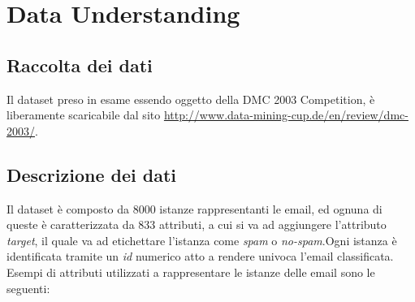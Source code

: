 \chapter{Data Understanding}
\section{Raccolta dei dati}
Il dataset preso in esame essendo oggetto della DMC 2003 Competition, è liberamente scaricabile dal sito \url{http://www.data-mining-cup.de/en/review/dmc-2003/}.


\section{Descrizione dei dati}
Il dataset è composto da 8000 istanze rappresentanti le email, ed ognuna di queste è caratterizzata da 833 attributi, a cui si va ad aggiungere l'attributo \textit{target}, il quale va ad etichettare l'istanza come \textit{spam} o \textit{no-spam}.Ogni istanza è identificata tramite un \textit{id} numerico atto a rendere univoca l'email classificata. Esempi di attributi utilizzati a rappresentare le istanze delle email sono le seguenti:


